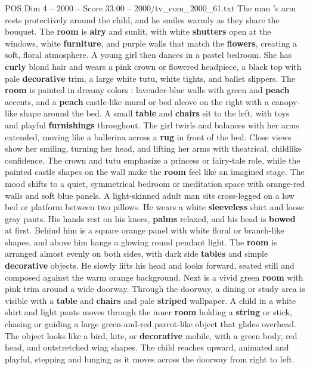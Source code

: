 \begin{textsample}{POS Dim 4 – 2000 – Score 33.00 – 2000/tv\_com\_2000\_61.txt}
The man ’s arm rests protectively around the child, and he smiles warmly as they share the bouquet.
The \textbf{room} is \textbf{airy} and sunlit, with white \textbf{shutters} open at the windows, white \textbf{furniture}, and purple walls that match the \textbf{flowers}, creating a soft, floral atmosphere.
A young girl then dances in a pastel bedroom.
She has \textbf{curly} blond hair and wears a pink crown or flowered headpiece, a black top with pale \textbf{decorative} trim, a large white tutu, white tights, and ballet slippers.
The \textbf{room} is painted in dreamy colors : lavender-blue walls with green and \textbf{peach} accents, and a \textbf{peach} castle-like mural or bed alcove on the right with a canopy-like shape around the bed.
A small \textbf{table} and \textbf{chairs} sit to the left, with toys and playful \textbf{furnishings} throughout.
The girl twirls and balances with her arms extended, moving like a ballerina across a \textbf{rug} in front of the bed.
Close views show her smiling, turning her head, and lifting her arms with theatrical, childlike confidence.
The crown and tutu emphasize a princess or fairy-tale role, while the painted castle shapes on the wall make the \textbf{room} feel like an imagined stage.
The mood shifts to a quiet, symmetrical bedroom or meditation space with orange-red walls and soft blue panels.
A light-skinned adult man sits cross-legged on a low bed or platform between two pillows.
He wears a white \textbf{sleeveless} shirt and loose gray pants.
His hands rest on his knees, \textbf{palms} relaxed, and his head is \textbf{bowed} at first.
Behind him is a square orange panel with white floral or branch-like shapes, and above him hangs a glowing round pendant light.
The \textbf{room} is arranged almost evenly on both sides, with dark side \textbf{tables} and simple \textbf{decorative} objects.
He slowly lifts his head and looks forward, seated still and composed against the warm orange background.
Next is a vivid green \textbf{room} with pink trim around a wide doorway.
Through the doorway, a dining or study area is visible with a \textbf{table} and \textbf{chairs} and pale \textbf{striped} wallpaper.
A child in a white shirt and light pants moves through the inner \textbf{room} holding a \textbf{string} or stick, chasing or guiding a large green-and-red parrot-like object that glides overhead.
The object looks like a bird, kite, or \textbf{decorative} mobile, with a green body, red head, and outstretched wing shapes.
The child reaches upward, animated and playful, stepping and lunging as it moves across the doorway from right to left.

\end{textsample}
